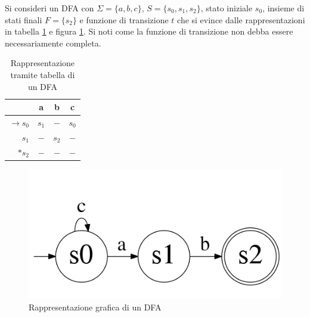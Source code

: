 \begin{ex}
Si consideri un DFA con $\Sigma = \{ a,b,c\}$, $S = \{ s_0,s_1,s_2\}$, stato iniziale $s_0$, insieme di stati finali $F = \{s_2\}$ e funzione di transizione $t$ che si evince dalle rappresentazioni in tabella \ref{tab:dfa} e figura \ref{fig:dfa}.
Si noti come la funzione di transizione non debba essere necessariamente completa.

\begin{table}[htbp]
\begin{center}
\begin{tabular}{r | c c c}
& a & b & c \\ \hline
$\rightarrow s_0$ & $s_1$ & $-$ & $s_0$ \\
$s_1$ & $-$ & $s_2$ & $-$\\
$*s_2$ & $-$ & $-$ & $-$\\ 
\end{tabular}
\caption{Rappresentazione tramite tabella di un DFA}
\label{tab:dfa}
\end{center}
\end{table}


\begin{figure}[htbp]
\centering
\includegraphics[scale=0.3]{./Img/automi/ex1.png}
\caption{Rappresentazione grafica di un DFA}
\label{fig:dfa}
\end{figure}

\end{ex}

\newpage
